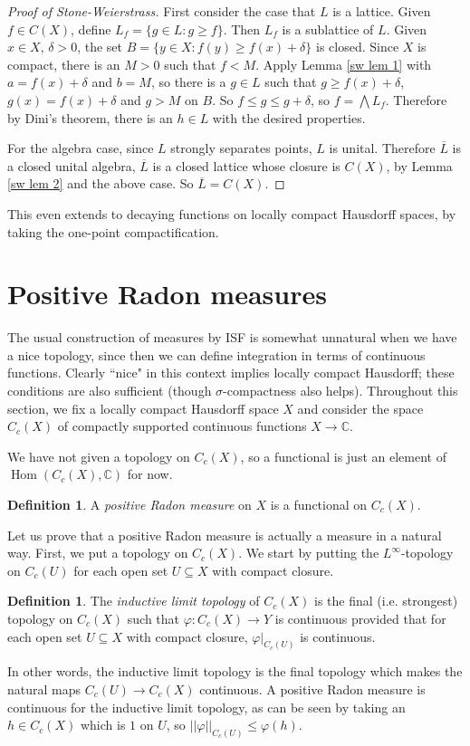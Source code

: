 \documentclass[12pt]{report}
\newcommand{\CC}{\mathbb{C}}
\newcommand{\Hom}{\operatorname{Hom}}
\newcommand{\dfn}[1]{\emph{#1}\index{#1}}
\theoremstyle{definition}
\newtheorem{definition}[theorem]{Definition}
\begin{document}
\begin{proof}[Proof of Stone-Weierstrass]
    First consider the case that $L$ is a lattice. Given $f \in C(X)$, define $L_f = \{g \in L: g \geq f\}$. Then $L_f$ is a sublattice of $L$. Given $x \in X$, $\delta > 0$, the set $B = \{y \in X: f(y) \geq f(x) + \delta\}$ is closed. Since $X$ is compact, there is an $M > 0$ such that $f < M$. Apply Lemma \ref{sw lem 1} with $a = f(x) + \delta$ and $b = M$, so there is a $g \in L$ such that $g \geq f(x) + \delta$, $g(x) = f(x) + \delta$ and $g > M$ on $B$. So $f \leq g \leq g + \delta$, so $f = \bigwedge L_f$. Therefore by Dini's theorem, there is an $h \in L$ with the desired properties.

    For the algebra case, since $L$ strongly separates points, $L$ is unital. Therefore $\overline L$ is a closed unital algebra, $\overline L$ is a closed lattice whose closure is $C(X)$, by Lemma \ref{sw lem 2} and the above case. So $\overline L = C(X)$.
\end{proof}
This even extends to decaying functions on locally compact Hausdorff spaces, by taking the one-point compactification.

\section{Positive Radon measures}
The usual construction of measures by ISF is somewhat unnatural when we have a nice topology, since then we can define integration in terms of continuous functions. Clearly ``nice" in this context implies locally compact Hausdorff; these conditions are also sufficient (though $\sigma$-compactness also helps). Throughout this section, we fix a locally compact Hausdorff space $X$ and consider the space $C_c(X)$ of compactly supported continuous functions $X \to \CC$.

We have not given a topology on $C_c(X)$, so a functional is just an element of $\Hom(C_c(X), \CC)$ for now.
\begin{definition}
    A \dfn{positive Radon measure} on $X$ is a functional on $C_c(X)$.
\end{definition}
Let us prove that a positive Radon measure is actually a measure in a natural way. First, we put a topology on $C_c(X)$. We start by putting the $L^\infty$-topology on $C_c(U)$ for each open set $U \subseteq X$ with compact closure.
\begin{definition}
    The \dfn{inductive limit topology} of $C_c(X)$ is the final (i.e. strongest) topology on $C_c(X)$ such that $\varphi: C_c(X) \to Y$ is continuous provided that for each open set $U \subseteq X$ with compact closure, $\varphi|_{C_c(U)}$ is continuous.
\end{definition}
In other words, the inductive limit topology is the final topology which makes the natural maps $C_c(U) \to C_c(X)$ continuous. A positive Radon measure is continuous for the inductive limit topology, as can be seen by taking an $h \in C_c(X)$ which is $1$ on $U$, so $||\varphi||_{C_c(U)} \leq \varphi(h)$.
\end{document}
